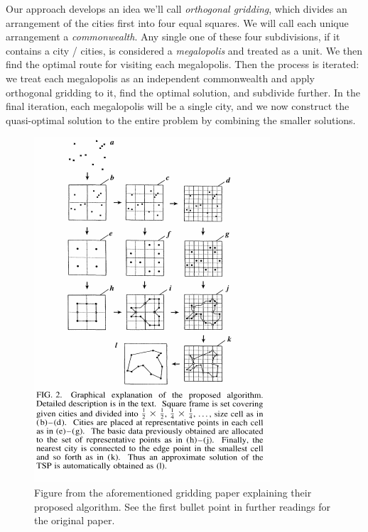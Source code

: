 \begin{enumerate}
\par
Our approach develops an idea we'll call \emph{orthogonal gridding}, which divides an arrangement of the cities first into four equal squares. We will call each unique arrangement a \emph{commonwealth}. Any single one of these four subdivisions, if it contains a city / cities, is considered a \emph{megalopolis} and treated as a unit. We then find the optimal route for visiting each megalopolis. Then the process is iterated: we treat each megalopolis as an independent commonwealth and apply orthogonal gridding to it, find the optimal solution, and subdivide further. In the final iteration, each megalopolis will be a single city, and we now construct the quasi-optimal solution to the entire problem by combining the smaller solutions. 

\begin{figure}[H]
\centering
\includegraphics{AlgGroup}
\caption{Figure from the aforementioned gridding paper explaining their proposed algorithm. See the first bullet point in further readings for the original paper.}
\end{figure}


\end{enumerate}
